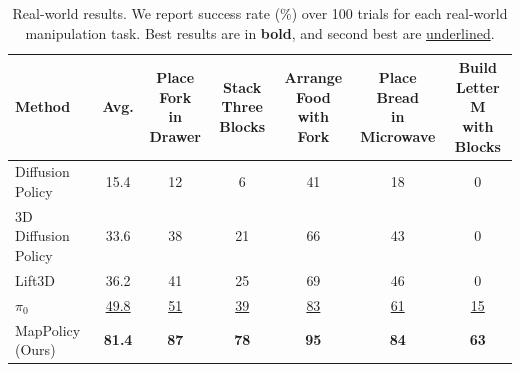 \begin{table}[t]
\centering
\caption{Real-world results. We report success rate (\%) over 100 trials for each real-world manipulation task. Best results are in \textbf{bold}, and second best are \underline{underlined}.}
\label{tab:real_world_results}
\small
\setlength{\tabcolsep}{4pt}
\begin{adjustbox}{max width=0.85\linewidth}
\begin{tabular}{l|c|ccccc}
\toprule
\rowcolor{tablehead}
Method & Avg. &
\shortstack{Place Fork\\in Drawer} &
\shortstack{Stack Three\\Blocks} &
\shortstack{Arrange Food\\with Fork} &
\shortstack{Place Bread\\in Microwave} &
\shortstack{Build Letter M\\with Blocks} \\
\midrule
Diffusion Policy~\cite{chi2024diffusionpolicy} & 15.4 & 12 & 6 & 41 & 18 & 0 \\
3D Diffusion Policy~\cite{Ze2024DP3} & 33.6 & 38 & 21 & 66 & 43 & 0 \\
Lift3D~\cite{Jia_2025_CVPR} & 36.2 & 41 & 25 & 69 & 46 & 0 \\
$\pi_0$~\cite{black2026pi0visionlanguageactionflowmodel} & \underline{49.8} & \underline{51} & \underline{39} & \underline{83} & \underline{61} & \underline{15} \\
\midrule
MapPolicy (Ours) & \textbf{81.4} & \textbf{87} & \textbf{78} & \textbf{95} & \textbf{84} & \textbf{63} \\
\bottomrule
\end{tabular}
\end{adjustbox}
\end{table}
